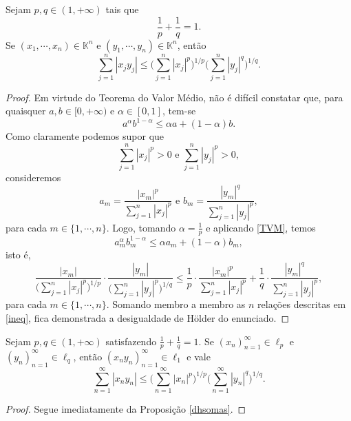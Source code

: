 \begin{proposition} \label{dhsomas}
    Sejam $p,q \in (1,+\infty)$ tais que 
    \[
    \displaystyle \frac{1}{p} + \frac{1}{q} =1.
    \]
    Se $(x_1, \cdots , x_n) \in \mathbb K^n$ e $(y_1, \cdots , y_n) \in \mathbb K^n$, então 
    \[
    \displaystyle \sum_{j=1}^{n} |x_j y_j|\leq \bigg( \sum_{j=1}^{n} |x_j|^p \bigg)^{1/p} \bigg( \sum_{j=1}^{n} |y_j|^q \bigg)^{1/q} .
    \]
\end{proposition}
\begin{proof}
    Em virtude do Teorema do Valor Médio, não é difícil constatar que, para quaisquer $a,b\in [0,+\infty )$ e $\alpha \in [0,1]$, tem-se
    \begin{equation}\label{TVM}
    \displaystyle a^{\alpha} b^{1-\alpha} \leq \alpha a + (1-\alpha )b.
    \end{equation}
    Como claramente podemos supor que
    \[
    \sum_{j=1}^{n} |x_j|^p >0 \text{  e  } \sum_{j=1}^{n} |y_j|^p >0,
    \]
    consideremos 
    \[
    \displaystyle a_{m} = \frac{|x_{m}|^p}{\sum_{j=1}^{n} |x_j|^p} \text{  e  } b_{m} = \frac{|y_{m}|^q}{\sum_{j=1}^{n} |y_j|^p},
    \]
    para cada $m\in \{1,\cdots , n\}$. Logo, tomando $\alpha = \frac{1}{p}$ e aplicando \eqref{TVM}, temos
    \[
    \displaystyle a_{m}^{\alpha} b_{m}^{1-\alpha} \leq \alpha a_m + (1-\alpha )b_m ,
    \]
    isto é,
    \begin{equation}\label{ineq}
    \displaystyle \frac{|x_{m}|}{\bigg(\sum_{j=1}^{n} |x_j|^p \bigg)^{1/p}} \cdot \frac{|y_{m}|}{\bigg(\sum_{j=1}^{n} |y_j|^p \bigg)^{1/q}}
    \leq \frac{1}{p} \cdot \frac{|x_{m}|^p}{\sum_{j=1}^{n} |x_j|^p}+ \frac{1}{q} \cdot \frac{|y_{m}|^q}{\sum_{j=1}^{n} |y_j|^p},
    \end{equation}
    para cada $m\in \{ 1,\cdots , n\}$. Somando membro a membro as $n$ relações descritas em \eqref{ineq}, fica demonstrada a desigualdade de Hölder do enunciado.
\end{proof}

\begin{corollary}
    Sejam $p,q \in (1,+\infty)$ satisfazendo $\frac{1}{p} + \frac{1}{q} =1$. Se $(x_n)_{n=1}^{\infty} \in \ell _p$ e $(y_n)_{n=1}^{\infty} \in \ell _q$, então $(x_n y_n)_{n=1}^{\infty} \in \ell _1$ e vale
    \[
    \displaystyle \sum_{n=1}^{\infty} |x_n y_n|\leq \bigg( \sum_{n=1}^{\infty} |x_n|^p \bigg)^{1/p} \bigg( \sum_{n=1}^{\infty} |y_n|^q \bigg)^{1/q} .
    \]
\end{corollary}
\begin{proof}
Segue imediatamente da Proposição \ref{dhsomas}.
\end{proof}


